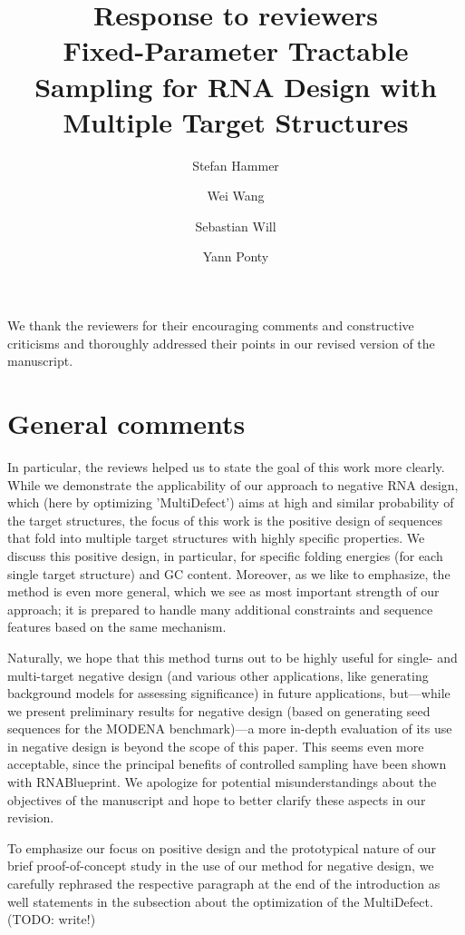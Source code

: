 \documentclass[11pt,hyperref]{article} %
\title{Response to reviewers\\[.3em]Fixed-Parameter Tractable Sampling for RNA Design with Multiple Target Structures}
\author{
Stefan Hammer \and Wei Wang \and Sebastian Will \and Yann Ponty}
\date{} %
\begin{document}
\maketitle

We thank the reviewers for their encouraging comments and constructive criticisms and thoroughly addressed their points in our revised version of the manuscript.

\section{General comments}

In particular, the reviews helped us to state the goal of this work more clearly. While we demonstrate the applicability of our approach to negative RNA design, which (here by optimizing 'MultiDefect') aims at high and similar probability of the target structures, the focus of this work is the positive design of sequences that fold into multiple target structures with highly specific properties. We discuss this positive design, in particular, for specific folding energies (for each single target structure) and GC content. Moreover, as we like to emphasize, the method is even more general, which we see as most important strength of our approach; it is prepared to handle many additional constraints and sequence features based on the same mechanism. 

Naturally, we hope that this method turns out to be highly useful for single- and multi-target negative design (and various other applications, like generating background models for assessing significance) in future applications, but---while we present preliminary results for negative design (based on generating seed sequences for the MODENA benchmark)---a more in-depth evaluation of its use in negative design is beyond the scope of this paper. This seems even more acceptable, since the principal benefits of controlled sampling have been shown with RNABlueprint. We apologize for potential misunderstandings about the objectives of the manuscript and hope to better clarify these aspects in our revision.

To emphasize our focus on positive design and the prototypical nature of our brief proof-of-concept study in the use of our method for negative design, we carefully rephrased the respective paragraph at the end of the introduction as well statements in the subsection about the optimization of the MultiDefect. (TODO: write!)

\end{document}
